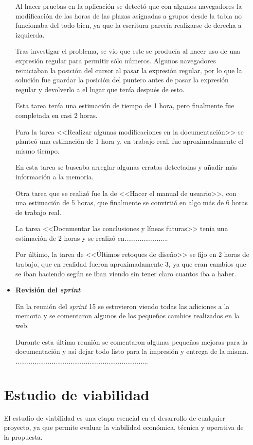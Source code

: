 \begin{itemize}
Al hacer pruebas en la aplicación se detectó que con algunos navegadores la modificación de las horas de las plazas asignadas a grupos desde la tabla no funcionaba del todo bien, ya que la escritura parecía realizarse de derecha a izquierda.

Tras investigar el problema, se vio que este se producía al hacer uso de una expresión regular para permitir sólo números. 
Algunos navegadores reiniciaban la posición del cursor al pasar la expresión regular, por lo que la solución fue guardar la posición del puntero antes de pasar la expresión regular y devolverlo a el lugar que tenía después de esto.

Esta tarea tenía una estimación de tiempo de 1 hora, pero finalmente fue completada en casi 2 horas.

Para la tarea <<Realizar algunas modificaciones en la documentación>> se planteó una estimación de 1 hora y, en trabajo real, fue aproximadamente el mismo tiempo.

En esta tarea se buscaba arreglar algunas erratas detectadas y añadir más información a la memoria.

Otra tarea que se realizó fue la de <<Hacer el manual de usuario>>, con una estimación de 5 horas, que finalmente se convirtió en algo más de 6 horas de trabajo real.

La tarea <<Documentar las conclusiones y líneas futuras>> tenía una estimación de 2 horas y se realizó en.......................

Por último, la tarea de <<Últimos retoques de diseño>> se fijo en 2 horas de trabajo, que en realidad fueron aproximadamente 3, ya que eran cambios que se iban haciendo según se iban viendo sin tener claro cuantos iba a haber.

\item\textbf{Revisión del \textit{sprint}}

En la reunión del \textit{sprint} 15 se estuvieron viendo todas las adiciones a la memoria y se comentaron algunos de los pequeños cambios realizados en la web.

Durante esta última reunión se comentaron algunas pequeñas mejoras para la documentación y así dejar todo listo para la impresión y entrega de la misma.
......................................................................
\end{itemize}

\section{Estudio de viabilidad}
El estudio de viabilidad es una etapa esencial en el desarrollo de cualquier proyecto, ya que permite evaluar la viabilidad económica, técnica y operativa de la propuesta. 


